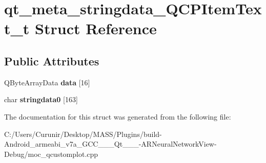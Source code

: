 \hypertarget{structqt__meta__stringdata___q_c_p_item_text__t}{}\section{qt\+\_\+meta\+\_\+stringdata\+\_\+\+Q\+C\+P\+Item\+Text\+\_\+t Struct Reference}
\label{structqt__meta__stringdata___q_c_p_item_text__t}
\subsection*{Public Attributes}
\begin{DoxyCompactItemize}
\item 
\mbox{\label{structqt__meta__stringdata___q_c_p_item_text__t_a2bd47ce26fc4c9ef2b1228d48bb56489}} 
Q\+Byte\+Array\+Data {\bfseries data} \mbox{[}16\mbox{]}
\item 
\mbox{\label{structqt__meta__stringdata___q_c_p_item_text__t_a1618ccb0caac6418e3f9f6b37d92ee2c}} 
char {\bfseries stringdata0} \mbox{[}163\mbox{]}
\end{DoxyCompactItemize}


The documentation for this struct was generated from the following file\+:\begin{DoxyCompactItemize}
\item 
C\+:/\+Users/\+Curunir/\+Desktop/\+M\+A\+S\+S/\+Plugins/build-\/\+Android\+\_\+armeabi\+\_\+v7a\+\_\+\+G\+C\+C\+\_\+\_\+\_\+\+Qt\+\_\+\_\+\_-\/\+A\+R\+Neural\+Network\+View-\/\+Debug/moc\+\_\+qcustomplot.\+cpp\end{DoxyCompactItemize}
